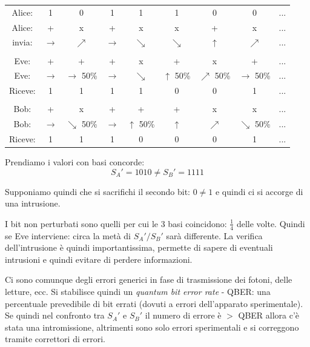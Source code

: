 \begin{table}[ht!]
    \centering
    \begin{tabular}{c|c c c c c c c c}
        Alice: & 1 & 0 & 1 & 1 & 1 & 0 & 0 & ... \\
        Alice: & + & x & + & x & x & + & x & ... \\
        invia: & $\rightarrow$ & $\nearrow$ & $\rightarrow$ & $\searrow$ & $\searrow$ & $\uparrow$ & $\nearrow$ & ... \\
    
        & & & & & & & & \\

        Eve: & + & + & + & x & + & x & + & ... \\
        Eve: & $\rightarrow$ & $\rightarrow$ 50\% & $\rightarrow$ & $\searrow$ & $\uparrow$ 50\% & $\nearrow$ 50\% & $\rightarrow$ 50\% & ... \\
        Riceve: & 1 & 1 & 1 & 1 & 0 & 0 & 1 & ... \\

        & & & & & & & & \\

        Bob: & + & x & + & + & + & x & x & ... \\
        Bob: & $\rightarrow$ & $\searrow$ 50\% & $\rightarrow$ & $\uparrow$ 50\% & $\uparrow$ & $\nearrow$ & $\searrow$ 50\% & ... \\
        Riceve: & 1 & 1 & 1 & 0 & 0 & 0 & 1 & ... \\
    \end{tabular}
\end{table}

Prendiamo i valori con basi concorde:
$$ S_A' = 1010 \neq S_B' = 1111 $$

Supponiamo quindi che si sacrifichi il secondo bit: $0 \neq 1$ e quindi ci si accorge di una intrusione.

I bit non perturbati sono quelli per cui le 3 basi coincidono: $\frac{1}{4}$ delle volte.
Quindi se Eve interviene: circa la metà di $S_A'/S_B'$ sarà differente.
La verifica dell'intrusione è quindi importantissima, permette di sapere di eventuali intrusioni e quindi evitare di perdere informazioni.

Ci sono comunque degli errori generici in fase di trasmissione dei fotoni, delle letture, ecc.
Si stabilisce quindi un \emph{quantum bit error rate} - QBER: una percentuale prevedibile di bit errati (dovuti a errori dell'apparato sperimentale).
Se quindi nel confronto tra $S_A'$ e $S_B'$ il numero di errore è $>$ QBER allora c'è stata una intromissione, altrimenti sono solo errori sperimentali e si correggono tramite correttori di errori.

